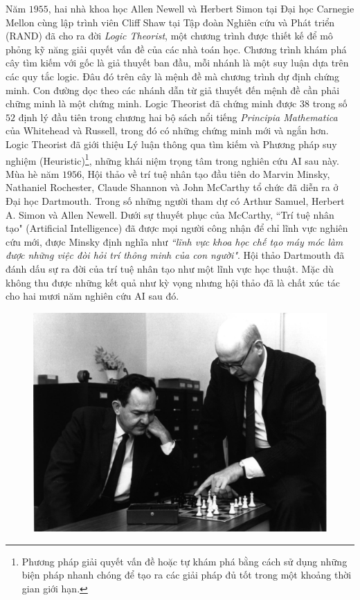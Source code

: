 \begin{multicols}{2}
	Năm $1955$, hai nhà khoa học Allen Newell và Herbert Simon tại Đại học Carnegie Mellon cùng lập trình viên Cliff Shaw tại Tập đoàn Nghiên cứu và Phát triển (RAND) đã cho ra đời \textit{Logic Theorist}, một chương trình được thiết kế để mô phỏng kỹ năng giải quyết vấn đề của các nhà toán học. Chương trình khám phá cây tìm kiếm với gốc là giả thuyết ban đầu, mỗi nhánh là một suy luận dựa trên các quy tắc logic. Đâu đó trên cây là mệnh đề mà chương trình dự định chứng minh. Con đường dọc theo các nhánh dẫn từ giả thuyết đến mệnh đề cần phải chững minh là một chứng minh. Logic Theorist đã chứng minh được $38$ trong số $52$ định lý đầu tiên trong chương hai bộ sách nổi tiếng \textit{Principia Mathematica} của Whitehead và Russell, trong đó có những chứng minh mới và ngắn hơn. Logic Theorist đã giới thiệu Lý luận thông qua tìm kiếm và Phương pháp suy nghiệm (Heuristic)\footnote{\color{cackithi}Phương pháp giải quyết vấn đề hoặc tự khám phá bằng cách sử dụng những biện pháp nhanh chóng để tạo ra các giải pháp đủ tốt trong một khoảng thời gian giới hạn.}, những khái niệm trọng tâm trong nghiên cứu AI sau này.
	\vskip 0.1cm
	Mùa hè năm $1956$, Hội thảo về trí tuệ nhân tạo đầu tiên do Marvin Minsky, Nathaniel Rochester, Claude Shannon và John McCarthy tổ chức đã diễn ra ở Đại học Dartmouth. Trong số những người tham dự có Arthur Samuel, Herbert A. Simon và Allen Newell. Dưới sự thuyết phục của McCarthy, ``Trí tuệ nhân tạo" (Artificial Intelligence) đã được mọi người công nhận để chỉ lĩnh vực nghiên cứu mới, được Minsky định nghĩa như \textit{``lĩnh vực khoa học chế tạo máy móc làm được những việc đòi hỏi trí thông minh của con người"}. Hội thảo Dartmouth đã đánh dấu sự ra đời của trí tuệ nhân tạo như một lĩnh vực học thuật. Mặc dù không thu được những kết quả như kỳ vọng nhưng hội thảo đã là chất xúc tác cho hai mươi năm nghiên cứu AI sau đó.
	\begin{figure}[H]
		\vspace*{-5pt}
		\centering
		\captionsetup{labelformat= empty, justification=centering}
		\includegraphics[width= 1\linewidth]{Newell_Simon.jpeg}

\end{figure}
\end{multicols}
